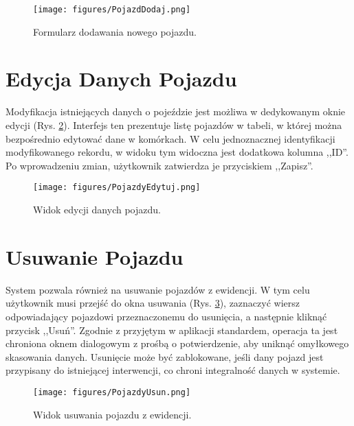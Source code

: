 \begin{figure}[H]
	\centering
	\texttt{[image: figures/PojazdDodaj.png]}
	\caption{Formularz dodawania nowego pojazdu.}
	\label{fig:pojazdy_dodaj_form}
\end{figure}

\section{Edycja Danych Pojazdu}
\label{sec:pojazdy_edycja}

Modyfikacja istniejących danych o pojeździe jest możliwa w dedykowanym oknie edycji (Rys. \ref{fig:pojazdy_edycja_widok}). Interfejs ten prezentuje listę pojazdów w tabeli, w której można bezpośrednio edytować dane w komórkach. W celu jednoznacznej identyfikacji modyfikowanego rekordu, w widoku tym widoczna jest dodatkowa kolumna ,,ID''. Po wprowadzeniu zmian, użytkownik zatwierdza je przyciskiem ,,Zapisz''.

\begin{figure}[H]
    \centering
    \texttt{[image: figures/PojazdyEdytuj.png]}
    \caption{Widok edycji danych pojazdu.}
    \label{fig:pojazdy_edycja_widok}
\end{figure}

\section{Usuwanie Pojazdu}
\label{sec:pojazdy_usuniecie}

System pozwala również na usuwanie pojazdów z ewidencji. W tym celu użytkownik musi przejść do okna usuwania (Rys. \ref{fig:pojazdy_usuniecie_widok}), zaznaczyć wiersz odpowiadający pojazdowi przeznaczonemu do usunięcia, a następnie kliknąć przycisk ,,Usuń''. Zgodnie z przyjętym w aplikacji standardem, operacja ta jest chroniona oknem dialogowym z prośbą o potwierdzenie, aby uniknąć omyłkowego skasowania danych. Usunięcie może być zablokowane, jeśli dany pojazd jest przypisany do istniejącej interwencji, co chroni integralność danych w systemie.

\begin{figure}[H]
    \centering
    \texttt{[image: figures/PojazdyUsun.png]}
    \caption{Widok usuwania pojazdu z ewidencji.}
    \label{fig:pojazdy_usuniecie_widok}
\end{figure}